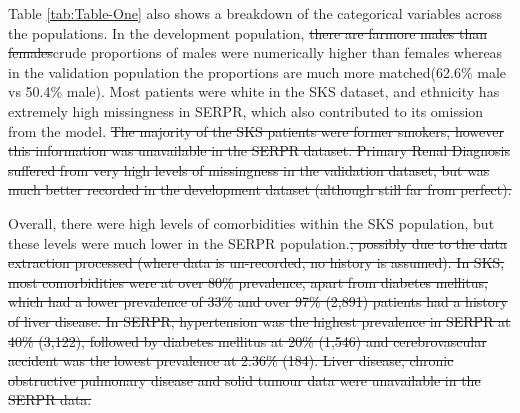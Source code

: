 \documentclass[12pt,PhD,twoside,openright]{muthesis}
\begin{document}
Table \ref{tab:Table-One} also shows a breakdown of the categorical variables across the populations. In the development population, \sout{there are farmore males than females}crude proportions of males were numerically higher than females whereas in the validation population the proportions are much more matched(62.6\% male vs 50.4\% male). Most patients were white in the SKS dataset, and ethnicity has extremely high missingness in SERPR, which also contributed to its omission from the model. \sout{The majority of the SKS patients were former smokers, however this information was unavailable in the SERPR dataset. Primary Renal Diagnosis suffered from very high levels of missingness in the validation dataset, but was much better recorded in the development dataset (although still far from perfect).}

Overall, there were high levels of comorbidities within the SKS population, but these levels were much lower in the SERPR population.\sout{, possibly due to the data extraction processed (where data is un-recorded, no history is assumed). In SKS, most comorbidities were at over 80\% prevalence, apart from diabetes mellitus, which had a lower prevalence of 33\% and over 97\% (2,891) patients had a history of liver disease. In SERPR, hypertension was the highest prevalence in SERPR at 40\% (3,122), followed by diabetes mellitus at 20\% (1,546) and cerebrovascular accident was the lowest prevalence at 2.36\% (184). Liver disease, chronic obstructive pulmonary disease and solid tumour data were unavailable in the SERPR data.}
\end{document}

